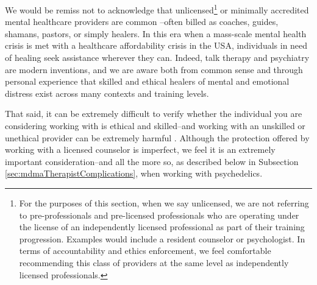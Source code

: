 \documentclass[12pt,letterpaper]{book}
\begin{document}
We would be remiss not to acknowledge that unlicensed\footnote{For the purposes of this section, when we say unlicensed, we are not referring to pre-professionals and pre-licensed professionals who are operating under the license of an independently licensed professional as part of their training progression. Examples would include a resident counselor or psychologist. In terms of accountability and ethics enforcement, we feel comfortable recommending this class of providers at the same level as independently licensed professionals.} or minimally accredited mental healthcare providers are common \cite{aboujaoude2020coachingVSTherapy} –often billed as coaches, guides, shamans, pastors, or simply healers. In this era when a mass-scale mental health crisis is met with a healthcare affordability crisis in the USA, individuals in need of healing seek assistance wherever they can. Indeed, talk therapy and psychiatry are modern inventions, and we are aware both from common sense and through personal experience that skilled and ethical healers of mental and emotional distress exist across many contexts and training levels. 

That said, it can be extremely difficult to verify whether the individual you are considering working with is ethical and skilled–and working with an unskilled or unethical provider can be extremely harmful \cite{hook2018boundary,therapisttocoach}. Although the protection offered by working with a licensed counselor is imperfect, we feel it is an extremely important consideration–and all the more so, as described below in Subsection \ref{sec:mdmaTherapistComplications}, when working with psychedelics. 
\end{document}
